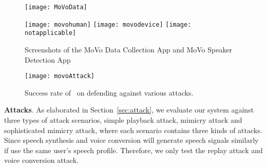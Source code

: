 \begin{figure}[h]
		\centering
		\begin{minipage}{.3\linewidth}
			\texttt{[image: MoVoData]}
		\end{minipage}
 \qquad 
	\begin{minipage}{.6\linewidth}
		\texttt{[image: movohuman]}
		\vspace{.1in}
		\texttt{[image: movodevice]}
		\vspace{.1in}
		\texttt{[image: notapplicable]}
	\end{minipage}
	\caption{Screenshots of the MoVo Data Collection App and MoVo Speaker Detection App}	
	\label{fig:defendapp}
\end{figure}

\begin{figure}[h]
	\centering
	\texttt{[image: movoAttack]}
	\caption{Success rate of \shortname~on defending against various attacks. }
	\label{fig:defend}
\end{figure}

\textbf{Attacks}. As elaborated in Section~\ref{sec:attack}, we evaluate our system against three types of attack scenarios, simple playback attack, mimicry attack and sophisticated mimicry attack, where each scenario contains three kinds of attacks.  Since speech synthesis and voice conversion will generate speech signals similarly if use the same user's speech profile. Therefore, we only test the replay attack and voice conversion attack.


